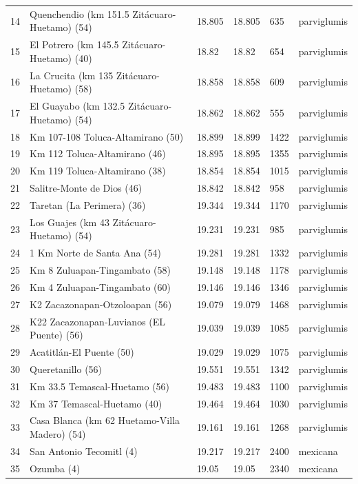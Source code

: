 \begin{table}
\begin{center}
{\begin{tabular}{r@{--}lllll}
14 & Quenchendio (km 151.5 Zit\'acuaro-Huetamo) (54) & 18.805 & 18.805 & 635 & parviglumis \\ 
15 & El Potrero (km 145.5 Zit\'acuaro-Huetamo) (40) & 18.82 & 18.82 & 654 & parviglumis \\ 
16 & La Crucita (km 135 Zit\'acuaro-Huetamo) (58) & 18.858 & 18.858 & 609 & parviglumis \\ 
17 & El Guayabo (km 132.5 Zit\'acuaro-Huetamo) (54) & 18.862 & 18.862 & 555 & parviglumis \\ 
18 & Km 107-108 Toluca-Altamirano (50) & 18.899 & 18.899 & 1422 & parviglumis \\ 
19 & Km 112 Toluca-Altamirano (46) & 18.895 & 18.895 & 1355 & parviglumis \\ 
20 & Km 119 Toluca-Altamirano (38) & 18.854 & 18.854 & 1015 & parviglumis \\ 
21 & Salitre-Monte de Dios (46) & 18.842 & 18.842 & 958 & parviglumis \\ 
22 & Taretan (La Perimera) (36) & 19.344 & 19.344 & 1170 & parviglumis \\ 
23 & Los Guajes (km 43 Zit\'acuaro-Huetamo) (54) & 19.231 & 19.231 & 985 & parviglumis \\ 
24 & 1 Km Norte de Santa Ana (54) & 19.281 & 19.281 & 1332 & parviglumis \\ 
25 & Km 8 Zuluapan-Tingambato (58) & 19.148 & 19.148 & 1178 & parviglumis \\ 
26 & Km 4 Zuluapan-Tingambato (60) & 19.146 & 19.146 & 1346 & parviglumis \\ 
27 & K2 Zacazonapan-Otzoloapan (56) & 19.079 & 19.079 & 1468 & parviglumis \\ 
28 & K22 Zacazonapan-Luvianos (EL Puente) (56) & 19.039 & 19.039 & 1085 & parviglumis \\ 
29 & Acatitl\'an-El Puente (50) & 19.029 & 19.029 & 1075 & parviglumis \\ 
30 & Queretanillo (56) & 19.551 & 19.551 & 1342 & parviglumis \\ 
31 & Km 33.5 Temascal-Huetamo (56) & 19.483 & 19.483 & 1100 & parviglumis \\ 
32 & Km 37 Temascal-Huetamo (40) & 19.464 & 19.464 & 1030 & parviglumis \\ 
33 & Casa Blanca (km 62 Huetamo-Villa Madero) (54) & 19.161 & 19.161 & 1268 & parviglumis \\ 
34 & San Antonio Tecomitl (4) & 19.217 & 19.217 & 2400 & mexicana \\ 
35 & Ozumba (4) & 19.05 & 19.05 & 2340 & mexicana \\ 

\end{tabular}}
\end{center}
\end{table}
